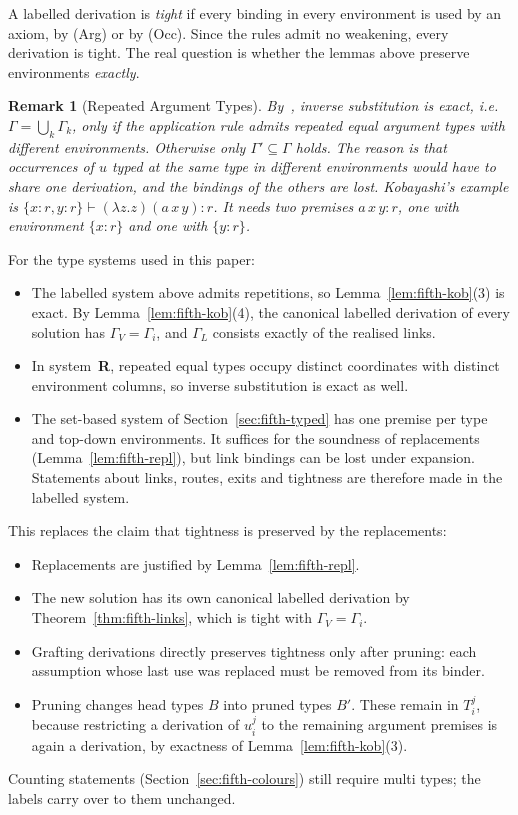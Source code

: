 \documentclass[10pt,a4paper]{article}
\theoremstyle{plain}%
\newtheorem{remark}[theorem]{Remark}
\begin{document}
A labelled derivation is \emph{tight} if every binding in every environment is used by an axiom, by (Arg) or by (Occ).
Since the rules admit no weakening, every derivation is tight.
The real question is whether the lemmas above preserve environments \emph{exactly}.

\begin{remark}[Repeated Argument Types]
By~\cite[Remark~8.1]{Kobayashi13}, inverse substitution is exact, i.e.\ $\Gamma = \bigcup_k \Gamma_k$, only if the application rule admits repeated equal argument types with different environments.
Otherwise only $\Gamma' \subseteq \Gamma$ holds.
The reason is that occurrences of $u$ typed at the same type in different environments would have to share one derivation, and the bindings of the others are lost.
Kobayashi's example is $\{x : r, y : r\} \vdash (\lambda z.z)(a\,x\,y) : r$.
It needs two premises $a\,x\,y : r$, one with environment $\{x : r\}$ and one with $\{y : r\}$.
\end{remark}

For the type systems used in this paper:
\begin{itemize}
\item The labelled system above admits repetitions, so Lemma~\ref{lem:fifth-kob}(3) is exact.
By Lemma~\ref{lem:fifth-kob}(4), the canonical labelled derivation of every solution has $\Gamma_V = \Gamma_i$, and $\Gamma_L$ consists exactly of the realised links.
\item In system~\textbf{R}, repeated equal types occupy distinct coordinates with distinct environment columns, so inverse substitution is exact as well.
\item The set-based system of Section~\ref{sec:fifth-typed} has one premise per type and top-down environments.
It suffices for the soundness of replacements (Lemma~\ref{lem:fifth-repl}), but link bindings can be lost under expansion.
Statements about links, routes, exits and tightness are therefore made in the labelled system.
\end{itemize}

This replaces the claim that tightness is preserved by the replacements:
\begin{itemize}
\item Replacements are justified by Lemma~\ref{lem:fifth-repl}.
\item The new solution has its own canonical labelled derivation by Theorem~\ref{thm:fifth-links}, which is tight with $\Gamma_V = \Gamma_i$.
\item Grafting derivations directly preserves tightness only after pruning: each assumption whose last use was replaced must be removed from its binder.
\item Pruning changes head types $B$ into pruned types $B'$.
These remain in $T_i^j$, because restricting a derivation of $u_i^j$ to the remaining argument premises is again a derivation, by exactness of Lemma~\ref{lem:fifth-kob}(3).
\end{itemize}
Counting statements (Section~\ref{sec:fifth-colours}) still require multi types; the labels carry over to them unchanged.
\end{document}
